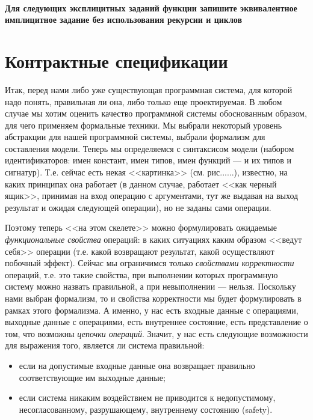\documentclass[14pt, twoside]{extreport}
\newcounter{problem_type}[chapter]
\newcommand{\head}[1]{\vspace{1cm}\subsubsection*{#1}}
\newcommand{\zhead}[1]{\head{#1} \refstepcounter{problem_type}}
\begin{document}
    

\zhead{Для следующих эксплицитных заданий функции запишите эквивалентное имплицитное задание без использования рекурсии и циклов}



\chapter{Контрактные спецификации}




Итак, перед нами либо уже существующая программная система, для которой надо понять, правильная ли она, либо только еще проектируемая. В любом случае мы хотим оценить качество программной системы обоснованным образом, для чего применяем формальные техники. Мы выбрали некоторый уровень абстракции для нашей программной системы, выбрали формализм для составления модели. Теперь мы определяемся с синтаксисом модели (набором идентификаторов: имен констант, имен типов, имен функций --- и их типов и сигнатур). Т.е. сейчас есть некая <<картинка>> (см. рис......), известно, на каких принципах она работает (в данном случае, работает <<как черный ящик>>, принимая на вход операцию с аргументами, тут же выдавая на выход результат и ожидая следующей операции), но не заданы сами операции.

Поэтому теперь <<на этом скелете>> можно формулировать ожидаемые \emph{функциональные свойства} операций: в каких ситуациях каким образом <<ведут себя>> операции (т.е. какой возвращают результат, какой осуществляют побочный эффект). Сейчас мы ограничимся только \emph{свойствами корректности} операций, т.е. это такие свойства, при выполнении которых программную систему можно назвать правильной, а при невыполнении --- нельзя. Поскольку нами выбран формализм, то и свойства корректности мы будет формулировать в рамках этого формализма. А именно, у нас есть входные данные с операциями, выходные данные с операциями, есть внутреннее состояние, есть представление о том, что возможны \emph{цепочки операций}. Значит, у нас есть следующие возможности для выражения того, является ли система правильной:
\begin{itemize}
\item если на допустимые входные данные она возвращает правильно соответствующие им выходные данные;
\item если система никаким воздействием не приводится к недопустимому, несогласованному, разрушающему, внутреннему состоянию (safety).
\end{itemize}
\end{document}
